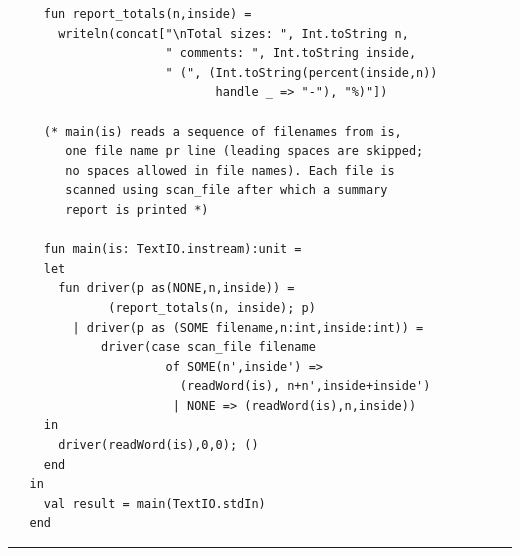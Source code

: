 \documentclass[12pt]{book}
\begin{document}
\begin{verbatim}
     fun report_totals(n,inside) = 
       writeln(concat["\nTotal sizes: ", Int.toString n,
                      " comments: ", Int.toString inside,
                      " (", (Int.toString(percent(inside,n)) 
                             handle _ => "-"), "%)"])

     (* main(is) reads a sequence of filenames from is,
        one file name pr line (leading spaces are skipped;
        no spaces allowed in file names). Each file is 
        scanned using scan_file after which a summary
        report is printed *)

     fun main(is: TextIO.instream):unit =
     let 
       fun driver(p as(NONE,n,inside)) = 
              (report_totals(n, inside); p)
         | driver(p as (SOME filename,n:int,inside:int)) =
             driver(case scan_file filename 
                      of SOME(n',inside') =>
                        (readWord(is), n+n',inside+inside')
                       | NONE => (readWord(is),n,inside))
     in
       driver(readWord(is),0,0); ()
     end
   in 
     val result = main(TextIO.stdIn)
   end
\end{verbatim}
\hrule
\bigskip
\end{document}
